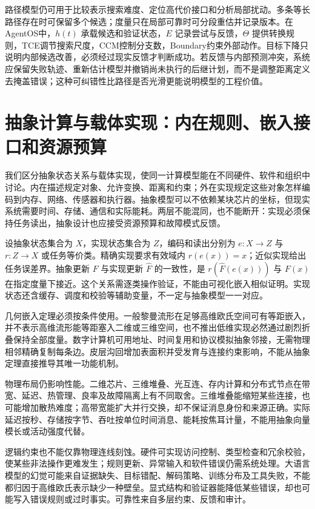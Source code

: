 路径模型仍可用于比较表示搜索难度、定位高代价接口和分析局部扰动。多条等长路径存在时可保留多个候选；度量只在局部可靠时可分段重估并记录版本。在AgentOS中，$h(t)$ 承载候选和验证状态，$E$ 记录尝试与反馈，$\Theta$ 提供转换规则，TCE调节搜索尺度，CCM控制分支数，Boundary约束外部动作。目标下降只说明内部候选改善，必须经过现实反馈才判断成功。若反馈与内部预测冲突，系统应保留失败轨迹、重新估计模型并撤销尚未执行的后继计划，而不是调整距离定义去掩盖错误；这种可纠错性比路径是否光滑更能说明模型的工程价值。

\section{抽象计算与载体实现：内在规则、嵌入接口和资源预算}
\label{sec:intrinsic_vs_extrinsic_geometry}

我们区分抽象状态关系与载体实现，使同一计算模型能在不同硬件、软件和组织中讨论。内在描述规定对象、允许变换、距离和约束；外在实现规定这些对象怎样编码到内存、网络、传感器和执行器。抽象模型可以不依赖某块芯片的坐标，但现实系统需要时间、存储、通信和实际能耗。两层不能混同，也不能断开：实现必须保持任务读出，抽象设计也应接受资源预算和故障模式反馈。

设抽象状态集合为 $X$，实现状态集合为 $Z$，编码和读出分别为 $e:X\to Z$ 与 $r:Z\to X$ 或任务等价类。精确实现要求有效域内 $r(e(x))=x$；近似实现给出任务误差界。抽象更新 $F$ 与实现更新 $\widehat F$ 的一致性，是 $r(\widehat F(e(x)))$ 与 $F(x)$ 在指定度量下接近。这个关系需逐类操作验证，不能由可视化嵌入相似证明。实现状态还含缓存、调度和校验等辅助变量，不一定与抽象模型一一对应。

几何嵌入定理必须按条件使用。一般黎曼流形在足够高维欧氏空间可有等距嵌入，并不表示高维流形能等距塞入二维或三维空间，也不推出低维实现必然通过剧烈折叠保持全部度量。数字计算机可用地址、时间复用和协议模拟抽象邻接，无需物理相邻精确复制每条边。皮层沟回增加表面积并受发育与连接约束影响，不能从抽象定理直接推导其唯一功能机制。

物理布局仍影响性能。二维芯片、三维堆叠、光互连、存内计算和分布式节点在带宽、延迟、热管理、良率及故障隔离上有不同取舍。三维堆叠能缩短某些连接，也可能增加散热难度；高带宽能扩大并行交换，却不保证消息身份和来源正确。实际延迟按秒、存储按字节、吞吐按单位时间消息、能耗按焦耳计量，不能用抽象向量模长或活动强度代替。

逻辑约束也不能仅靠物理连线刻蚀。硬件可实现访问控制、类型检查和冗余校验，使某些非法操作更难发生；规则更新、异常输入和软件错误仍需系统处理。大语言模型的幻觉可能来自证据缺失、目标错配、解码策略、训练分布及工具失败，不能都归因于高维欧氏表示缺少一种壁垒。显式结构和验证器能降低某些错误，却也可能写入错误规则或过时事实。可靠性来自多层约束、反馈和审计。

